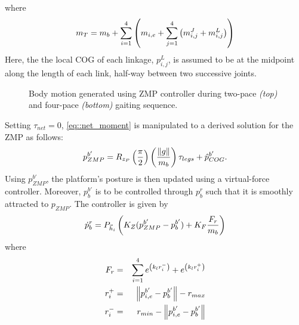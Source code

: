 		where
			\begin{equation}
				m_{T} = m_{b} + \sum_{i=1}^{4} \left(m_{i,e} + \sum_{j=1}^{4} \left(  m_{i,j}^{J} +  m_{i,j}^{L} \right) \right)
			\end{equation}
		Here, the the local COG of each linkage, ${p}_{i,j}^{L}$, is assumed to be at the midpoint along the length of each link, half-way between two successive joints.
			\begin{figure}[!h]
				\centering
				\caption{Body motion generated using ZMP controller during two-pace \emph{(top)} and four-pace \emph{(bottom)} gaiting sequence.}
				\label{fig::body_motion}
			\end{figure}
		Setting $\tau_{net}=0$, \ref{eq::net_moment} is manipulated to a derived solution for the ZMP as follows:
			\begin{equation}
				{p}_{ZMP}^{b'} = R_{z_P} \left(\frac{\pi}{2}\right)  \left( \frac{\left\lVert g\right\rVert}{m_{b}}\right) \tau_{legs} + \hat{p}_{COG}^{b'}.
				\label{eq::ZMPFromMoment}
			\end{equation}
		Using ${p}_{ZMP}^{b'}$, the platform's posture is then updated using a virtual-force controller. Moreover, ${p}_{b}^{b'}$ is to be controlled through  ${p}_{b}^{r}$ such that it is smoothly attracted to ${p}_{ZMP}$. The controller is given by
			\begin{equation}
				\dot{p}_{b}^{r} 	= {P}_{\vec{h}_{i}} \left(K_{Z}	( {p}_{ZMP}^{b'} - {p}_{b}^{b'} )  
				+ K_{F}\frac{F_{r}}{m_{b}}  \right)
				\label{eq::ZMPController}
			\end{equation}	
		where
			\begin{eqnarray*}
				F_{r} 	& = &  \sum_{i=1}^{4}  e^{\left( k_{l} r_{i}^{-} \right) } + e^{ \left( k_{l} r_{i}^{+} \right) } \nonumber \\
				r_{i}^{+}	& = & \left\lVert{p}_{i,e}^{b'}- {p}_{b}^{b'}\right\rVert - r_{max} \nonumber \\
				r_{i}^{-}	& = & r_{min} - \left\lVert{p}_{i,e}^{b'}- {p}_{b}^{b'}\right\rVert \nonumber
			\end{eqnarray*}
